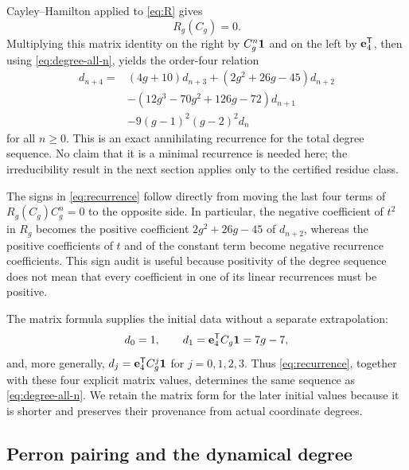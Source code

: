 \documentclass[11pt]{article}
\theoremstyle{remark}
\numberwithin{equation}{section}
\begin{document}
Cayley--Hamilton applied to \eqref{eq:R} gives
\[
R_g(C_g)=0.
\]
Multiplying this matrix identity on the right by \(C_g^n\mathbf{1}\) and on the
left by \(\mathbf{e}_4^{\mathsf{T}}\), then using
\eqref{eq:degree-all-n}, yields the order-four relation
\begin{equation}\label{eq:recurrence}
\begin{aligned}
d_{n+4}={}&(4g+10)d_{n+3}
+(2g^2+26g-45)d_{n+2}\\
&-(12g^3-70g^2+126g-72)d_{n+1}\\
&-9(g-1)^2(g-2)^2d_n
\end{aligned}
\end{equation}
for all \(n\geq0\).  This is an exact annihilating recurrence for the total
degree sequence.  No claim that it is a minimal recurrence is needed here;
the irreducibility result in the next section applies only to the certified
residue class.

The signs in \eqref{eq:recurrence} follow directly from moving the last
four terms of \(R_g(C_g)C_g^n=0\) to the opposite side.  In particular, the
negative coefficient of \(t^2\) in \(R_g\) becomes the positive coefficient
\(2g^2+26g-45\) of \(d_{n+2}\), whereas the positive coefficients of \(t\)
and of the constant term become negative recurrence coefficients.  This
sign audit is useful because positivity of the degree sequence does not
mean that every coefficient in one of its linear recurrences must be
positive.

The matrix formula supplies the initial data without a separate
extrapolation:
\[
d_0=1,\qquad d_1=\mathbf{e}_4^{\mathsf{T}}C_g\mathbf{1}=7g-7,
\]
and, more generally, \(d_j=\mathbf{e}_4^{\mathsf{T}}C_g^j\mathbf{1}\) for
\(j=0,1,2,3\).  Thus \eqref{eq:recurrence}, together with these four
explicit matrix values, determines the same sequence as
\eqref{eq:degree-all-n}.  We retain the matrix form for the later initial
values because it is shorter and preserves their provenance from actual
coordinate degrees.

\subsection{Perron pairing and the dynamical degree}
\end{document}

